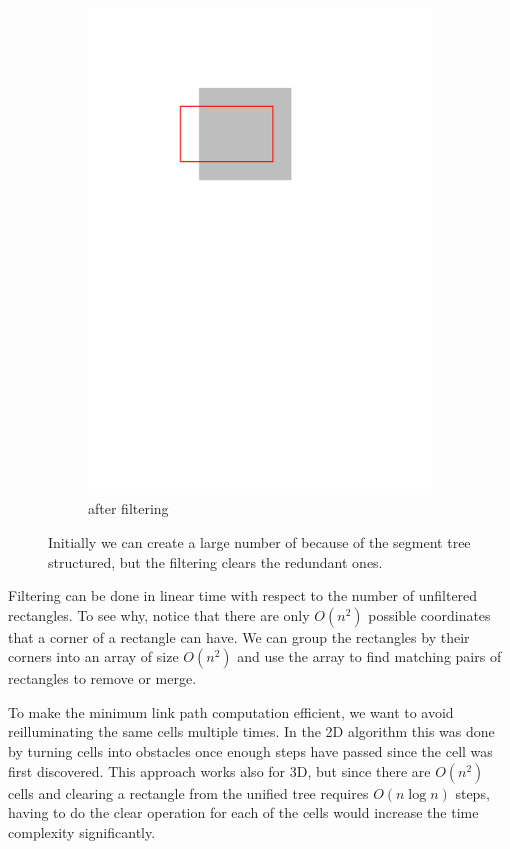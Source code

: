 \documentclass[english,gradu]{tktltiki2018}
\begin{document}
\begin{figure}
\begin{subfigure}[t]{0.3\textwidth}
		\includegraphics[width=\textwidth,page=3]{fig/filter}
		\caption{\addEs after filtering}
	\end{subfigure}
	\caption{Initially we can create a large number of \addEs because of the segment tree structured, but the filtering clears the redundant ones.}\label{fig:filter}
\end{figure}

Filtering can be done in linear time with respect to the number of unfiltered rectangles.
To see why, notice that there are only $O(n^2)$ possible coordinates that a corner of a rectangle can have.
We can group the rectangles by their corners into an array of size $O(n^2)$ and use the array to find matching pairs of rectangles to remove or merge.

To make the minimum link path computation efficient, we want to avoid reilluminating the same cells multiple times.
In the 2D algorithm this was done by turning cells into obstacles once enough steps have passed since the cell was first discovered.
This approach works also for 3D, but since there are $O(n^2)$ cells and clearing a rectangle from the unified tree requires $O(n\log n)$ steps, having to do the clear operation for each of the cells would increase the time complexity significantly.
\end{document}
